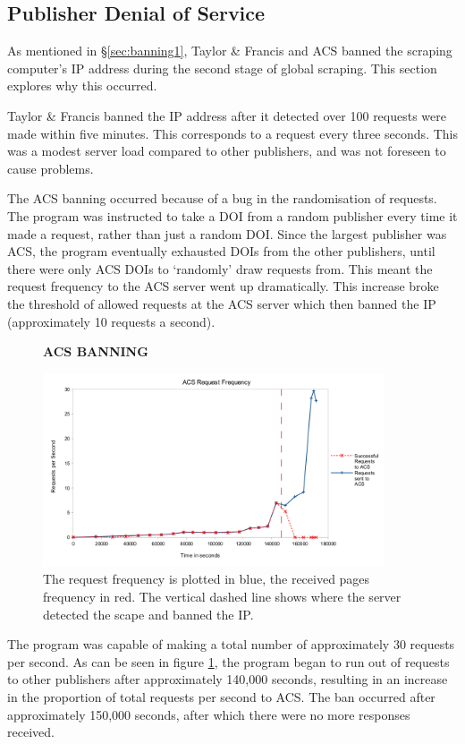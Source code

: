 \label{sec:data_acc_appendix}
\subsection{Publisher Denial of Service}
\label{sec:banning2}
As mentioned in \S\ref{sec:banning1}, Taylor \& Francis and ACS banned the scraping computer's IP address during the second stage of global scraping. This section explores why this occurred.

Taylor \& Francis banned the IP address after it detected over 100 requests were made within five minutes. This corresponds to a request every three seconds. This was a modest server load compared to other publishers, and was not foreseen to cause problems.

The ACS banning occurred because of a bug in the randomisation of requests. The program was instructed to take a DOI from a random publisher every time it made a request, rather than just a random DOI. Since the largest publisher was ACS, the program eventually exhausted DOIs from the other publishers, until there were only ACS DOIs to `randomly' draw requests from. This meant the request frequency to the ACS server went up dramatically. This increase broke the threshold of allowed requests at the ACS server which then banned the IP (approximately 10 requests a second).

\begin{figure}[H]
    \centering
    \textbf{ACS BANNING}\par\medskip
    \includegraphics[width=0.9\textwidth]{Data_Acquisition/ACS_crash_line.png}
    \caption[Request Frequency Leading to ACS Ban]{The request frequency is plotted in blue, the received pages frequency in red. The vertical dashed line shows where the server detected the scape and banned the IP.}
     \label{fig:ACSBAN}
\end{figure}
The program was capable of making a total number of approximately 30 requests per second. As can be seen in figure \ref{fig:ACSBAN}, the program began to run out of requests to other publishers after approximately 140,000 seconds, resulting in an increase in the proportion of total requests per second to ACS. The ban occurred after approximately 150,000 seconds, after which there were no more responses received.

